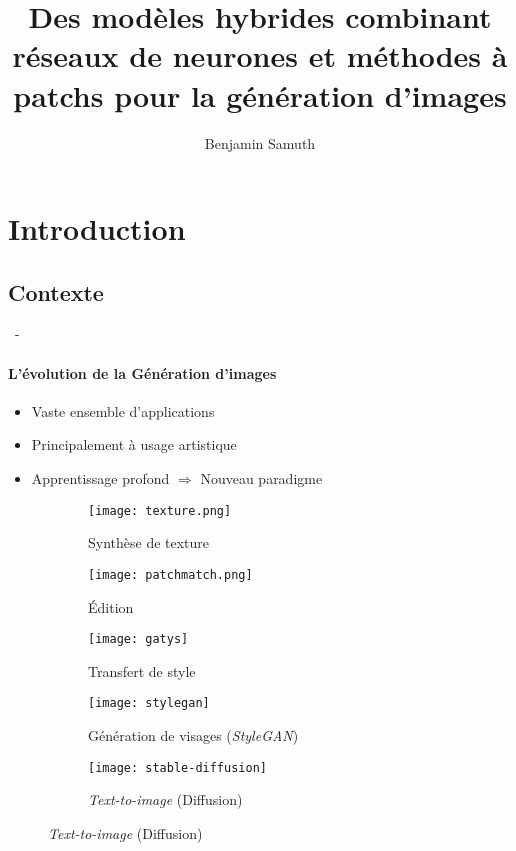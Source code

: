 \documentclass[aspectratio=169, 22pt]{beamer}
\title[Modèles hybrides pour la génération d'images]{Des modèles hybrides combinant réseaux de neurones et méthodes à patchs pour la génération d'images}
\subtitle{}
\author[Benjamin Samuth]{Benjamin Samuth}
\institute[Normandie University]{Normandie Univ, UNICAEN, ENSICAEN, CNRS, GREYC, Caen, FRANCE}
\begin{document}
\begin{frame}
  \titlepage
\end{frame}

\section{Introduction}

\subsection{Contexte}
\begin{frame}{\secname~- \subsecname}
  \framesubtitle{L'évolution de la Génération d'images}
      \begin{itemize}
      \item Vaste ensemble d'applications
      \item Principalement à usage artistique
      \item Apprentissage profond $\Rightarrow$ \alert{Nouveau paradigme}
      \end{itemize}
      
      \begin{figure}
        \captionsetup[subfigure]{labelformat=empty}
        \centering
        \begin{subfigure}[t]{0.19\linewidth}\centering
          \texttt{[image: texture.png]}
          \caption{{\scriptsize Synthèse de texture \newline {\tiny [Ashikhmin et al., 2001]}}}
        \end{subfigure}
        \begin{subfigure}[t]{0.19\linewidth}\centering
          \texttt{[image: patchmatch.png]}
          \caption{{\footnotesize Édition \newline {\scriptsize [Barnes et al., 2009]}}}
        \end{subfigure}        
        \begin{subfigure}[t]{0.19\linewidth}\centering
          \texttt{[image: gatys]}
          \caption{{\footnotesize Transfert de style \newline {\scriptsize [Gatys et al., 2014]}}}
        \end{subfigure}
        \begin{subfigure}[t]{0.19\linewidth}\centering
          \texttt{[image: stylegan]}
          \caption{{\footnotesize Génération de visages (\emph{StyleGAN}) \newline {\scriptsize [Karras et al., 2019]}}}
        \end{subfigure}        
        \begin{subfigure}[t]{0.19\linewidth}\centering
          \texttt{[image: stable-diffusion]}
          \caption{{\footnotesize \emph{Text-to-image} (Diffusion) \newline {\tiny [Rombach et al., 2022]}}}
        \end{subfigure}
      \end{figure}
\end{frame}
\end{document}
